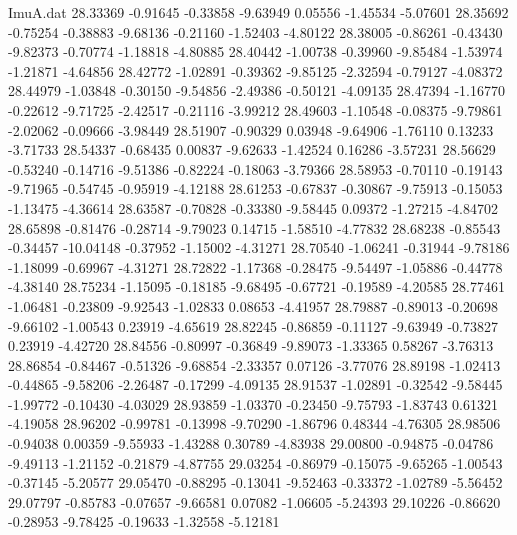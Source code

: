 \begin{filecontents}{ImuA.dat}
  28.33369   -0.91645   -0.33858   -9.63949    0.05556   -1.45534   -5.07601
  28.35692   -0.75254   -0.38883   -9.68136   -0.21160   -1.52403   -4.80122
  28.38005   -0.86261   -0.43430   -9.82373   -0.70774   -1.18818   -4.80885
  28.40442   -1.00738   -0.39960   -9.85484   -1.53974   -1.21871   -4.64856
  28.42772   -1.02891   -0.39362   -9.85125   -2.32594   -0.79127   -4.08372
  28.44979   -1.03848   -0.30150   -9.54856   -2.49386   -0.50121   -4.09135
  28.47394   -1.16770   -0.22612   -9.71725   -2.42517   -0.21116   -3.99212
  28.49603   -1.10548   -0.08375   -9.79861   -2.02062   -0.09666   -3.98449
  28.51907   -0.90329    0.03948   -9.64906   -1.76110    0.13233   -3.71733
  28.54337   -0.68435    0.00837   -9.62633   -1.42524    0.16286   -3.57231
  28.56629   -0.53240   -0.14716   -9.51386   -0.82224   -0.18063   -3.79366
  28.58953   -0.70110   -0.19143   -9.71965   -0.54745   -0.95919   -4.12188
  28.61253   -0.67837   -0.30867   -9.75913   -0.15053   -1.13475   -4.36614
  28.63587   -0.70828   -0.33380   -9.58445    0.09372   -1.27215   -4.84702
  28.65898   -0.81476   -0.28714   -9.79023    0.14715   -1.58510   -4.77832
  28.68238   -0.85543   -0.34457  -10.04148   -0.37952   -1.15002   -4.31271
  28.70540   -1.06241   -0.31944   -9.78186   -1.18099   -0.69967   -4.31271
  28.72822   -1.17368   -0.28475   -9.54497   -1.05886   -0.44778   -4.38140
  28.75234   -1.15095   -0.18185   -9.68495   -0.67721   -0.19589   -4.20585
  28.77461   -1.06481   -0.23809   -9.92543   -1.02833    0.08653   -4.41957
  28.79887   -0.89013   -0.20698   -9.66102   -1.00543    0.23919   -4.65619
  28.82245   -0.86859   -0.11127   -9.63949   -0.73827    0.23919   -4.42720
  28.84556   -0.80997   -0.36849   -9.89073   -1.33365    0.58267   -3.76313
  28.86854   -0.84467   -0.51326   -9.68854   -2.33357    0.07126   -3.77076
  28.89198   -1.02413   -0.44865   -9.58206   -2.26487   -0.17299   -4.09135
  28.91537   -1.02891   -0.32542   -9.58445   -1.99772   -0.10430   -4.03029
  28.93859   -1.03370   -0.23450   -9.75793   -1.83743    0.61321   -4.19058
  28.96202   -0.99781   -0.13998   -9.70290   -1.86796    0.48344   -4.76305
  28.98506   -0.94038    0.00359   -9.55933   -1.43288    0.30789   -4.83938
  29.00800   -0.94875   -0.04786   -9.49113   -1.21152   -0.21879   -4.87755
  29.03254   -0.86979   -0.15075   -9.65265   -1.00543   -0.37145   -5.20577
  29.05470   -0.88295   -0.13041   -9.52463   -0.33372   -1.02789   -5.56452
  29.07797   -0.85783   -0.07657   -9.66581    0.07082   -1.06605   -5.24393
  29.10226   -0.86620   -0.28953   -9.78425   -0.19633   -1.32558   -5.12181

\end{filecontents}
